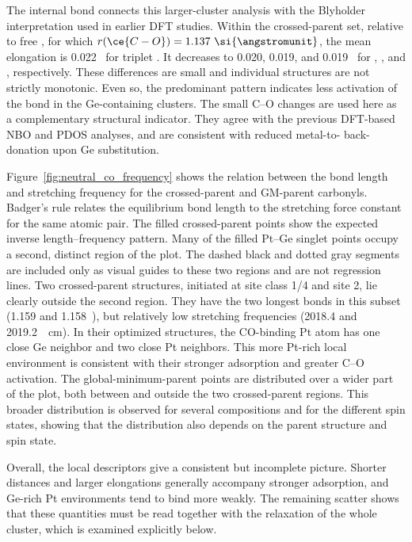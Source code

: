 The internal  bond connects this larger-cluster analysis with the
Blyholder interpretation used in earlier DFT studies.\cite{ugartemendia:2021,ugartemendia:2022} Within the
crossed-parent set, relative to free , for which
$r(\ce{C-O})=1.137~\si{\angstromunit}$, the mean elongation is 0.022~\si{\angstromunit}{} for triplet
. It decreases to 0.020, 0.019, and 0.019~\si{\angstromunit}{} for
, , and , respectively. These
differences are small and individual structures are not strictly monotonic.
Even so, the predominant pattern indicates less activation of the 
bond in the Ge-containing clusters. The small C--O changes are used here as a
complementary structural indicator. They agree with the previous DFT-based
NBO\cite{ugartemendia:2021} and PDOS\cite{ugartemendia:2022} analyses, and
are consistent with reduced metal-to- back-donation upon Ge
substitution.

Figure~\ref{fig:neutral_co_frequency} shows the relation between the 
bond length and stretching frequency for the crossed-parent and GM-parent
carbonyls. Badger's rule
relates the equilibrium bond length to the stretching force constant for the
same atomic pair.\cite{badger:1934,dabo:2012} The filled crossed-parent
 points show the expected inverse length--frequency pattern. Many
of the filled Pt--Ge singlet points occupy a second, distinct region of the
plot. The dashed black and dotted gray segments are included only as visual
guides to these two regions and are not regression lines. Two crossed-parent
 structures, initiated at site class 1/4 and site 2, lie clearly
outside the second region. They have the two longest  bonds in this
subset (1.159 and 1.158~\si{\angstromunit}), but relatively low stretching
frequencies (2018.4 and 2019.2~\si{\per\centi\metre}). In their optimized structures, the
CO-binding Pt atom has one close Ge neighbor and two close Pt neighbors. This
more Pt-rich local environment is consistent with their stronger adsorption
and greater C--O activation. The global-minimum-parent points are distributed
over a wider part of the plot, both between and outside the two crossed-parent
regions. This broader distribution is observed for several compositions and
for the different  spin states, {showing that the distribution
also depends on the parent structure and spin state.}

Overall, the local descriptors give a consistent but incomplete picture.
Shorter  distances and larger  elongations generally accompany
stronger adsorption, and Ge-rich Pt environments tend to bind  more
weakly. The remaining scatter shows that these quantities must be read together
with the relaxation of the whole cluster, which is examined explicitly below.

